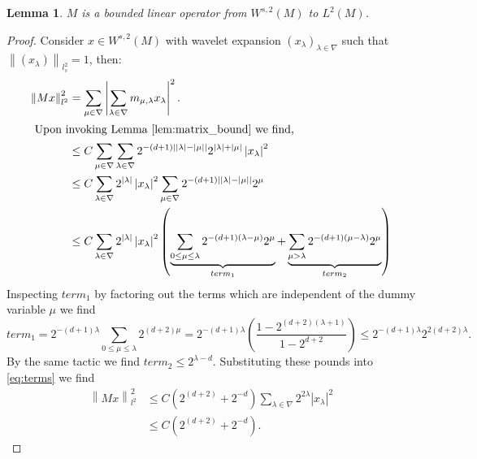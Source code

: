 \documentclass[12pt]{amsart}
\newtheorem{lemma}{Lemma}
\newcommand{\card}[1]{{\lvert#1\rvert}}
\newcommand{\abs}[1]{\ensuremath{\left\lvert #1\right\rvert}}
\newcommand{\norm}[1]{\ensuremath{\left\lVert #1\right\rVert}}
\begin{document}
\begin{lemma} \label{lem:M_bound}
	$M$ is a bounded linear operator from $W^{s,2}(M)$ to $L^2(M)$.
\end{lemma}
\begin{proof}
	Consider $x \in W^{s,2}(M)$ with wavelet expansion $(x_\lambda)_{\lambda \in \nabla}$ such that $\norm{(x_\lambda)}_{l_s^2} = 1$, then:
	\begin{align}
		\norm{Mx}_{l^2}^2   &=    \sum_{\mu \in \nabla} \abs{ \sum_{\lambda \in \nabla} m_{\mu,\lambda} x_{\lambda} }^2. \nonumber \\
		\intertext{ Upon invoking Lemma \ref{lem:matrix_bound} we find,}
							&\leq C\sum_{\mu \in \nabla} \sum_{\lambda \in \nabla} 2^{-(d+1)\abs{\card{\lambda} - \card{\mu}}} 2^{\card{\lambda}+\card{\mu}} \abs{x_\lambda}^2 \nonumber \\
							&\leq C\sum_{\lambda \in \nabla} 2^{\card{\lambda}} \abs{x_\lambda}^2 \sum_{\mu \in \nabla} 2^{-(d+1)\abs{\card{\lambda}-\card{\mu}}}2^\mu \nonumber \\
							&\leq C\sum_{\lambda \in \nabla}  2^{\card{\lambda}} \abs{x_\lambda}^2 \left( \underbrace{\sum_{0\leq\mu\leq\lambda} 2^{-(d+1)(\lambda - \mu)}2^{\mu}}_{term_1} + \underbrace{\sum_{\mu > \lambda} 2^{-(d+1)(\mu-\lambda)}2^{\mu} }_{term_2} \right) \label{eq:terms}
		\end{align}
		Inspecting $term_1$ by factoring out the terms which are independent of the dummy variable $\mu$ we find
		\[
			term_1 = 2^{-(d+1) \lambda }\sum_{0\leq\mu\leq\lambda} 2^{(d+2) \mu} = 2^{-(d+1) \lambda} \left(  \frac{ 1-2^{(d+2)(\lambda + 1)} }{1 - 2^{d+2} } \right) \leq 2^{-(d+1) \lambda} 2^{2(d+2)\lambda}.
		\]
		By the same tactic we find $term_2 \leq 2^{\lambda - d}$.  Substituting these pounds into \eqref{eq:terms} we find
		\begin{align*}	
			\norm{Mx}_{l^2}^2 	&\leq C(2^{(d+2)}+2^{-d}) \sum_{\lambda \in \nabla} 2^{2\lambda} \abs{x_{\lambda}}^2 \\
							&\leq C(2^{(d+2)}+2^{-d}).
		\end{align*}
\end{proof}
\end{document}
